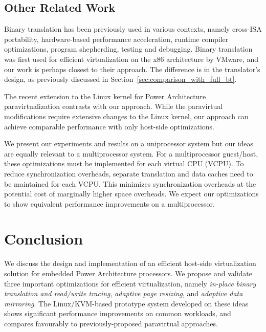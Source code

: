 \documentclass[10pt,twocolumn]{article}
\begin{document}
\subsection{Other Related Work}
Binary translation has been previously used in various contexts, namely
cross-ISA portability\cite{bansal:osdi08, qemu:software}, hardware-based
performance acceleration\cite{transmeta_crusoe:chip}, runtime compiler
optimizations\cite{bala00dynamo}, program shepherding\cite{bruening04thesis},
testing and debugging\cite{valgrind}. Binary translation was
first used for efficient virtualization on the x86 architecture by
VMware\cite{adams:asplos06}, and our work
is perhaps closest to their approach. The difference is in the translator's design,
as previously discussed in Section~\ref{sec:comparison_with_full_bt}.

The recent extension to the Linux kernel for Power Architecture paravirtualization
contrasts with our approach. While the paravirtual modifications require extensive
changes to the Linux kernel, our approach can achieve comparable performance
with only host-side optimizations.

We present our experiments and results on a uniprocessor system but our
ideas are equally relevant to a multiprocessor system. For a multiprocessor
guest/host, these optimizations must be implemented for each virtual CPU (VCPU).
To reduce synchronization
overheads, separate translation and data caches need to be maintained for each VCPU.
This minimizes synchronization overheads at the potential cost of marginally higher
space overheads. We expect
our optimizations to show equivalent performance improvements on a multiprocessor.
\section{Conclusion}
\label{sec:conclusion}
We discuss the design and implementation of an efficient host-side virtualization
solution
for embedded Power Architecture processors. We propose and validate three important
optimizations
for efficient virtualization, namely {\em in-place binary translation and read/write
tracing}, {\em adaptive page resizing}, and {\em adaptive data mirroring}. 
The Linux/KVM-based prototype system developed on these ideas shows significant
performance improvements on common workloads, and compares favourably to
previously-proposed paravirtual approaches.


\end{document}
